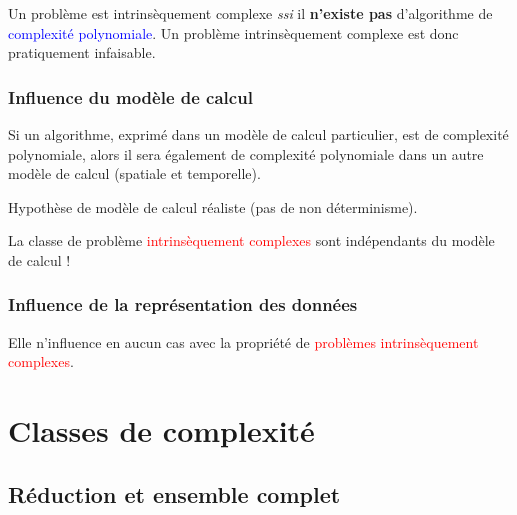 \documentclass{report}
\begin{document}
Un problème est intrinsèquement complexe \textit{ssi} il \textbf{n'existe pas} d'algorithme de \textcolor{blue}{complexité polynomiale}. Un problème intrinsèquement complexe est donc pratiquement infaisable.

\subsection{Influence du modèle de calcul}
Si un algorithme, exprimé dans un modèle de calcul particulier, est de complexité polynomiale, alors il sera également de complexité polynomiale dans un autre modèle de calcul (spatiale et temporelle).\par
Hypothèse de modèle de calcul réaliste (pas de non déterminisme).\par 
La classe de problème \textcolor{red}{intrinsèquement complexes} sont indépendants du modèle de calcul !

\subsection{Influence de la représentation des données}
Elle n'influence en aucun cas avec la propriété de \textcolor{red}{problèmes intrinsèquement complexes}. 


\chapter{Classes de complexité}
\section{Réduction et ensemble complet}
\end{document}
